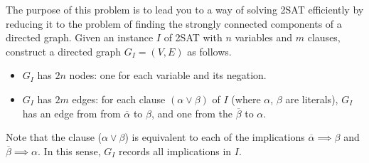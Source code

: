 \documentclass[10.5pt]{article}
\begin{document}
The purpose of this problem is to lead you to a way of solving 2SAT efficiently by reducing it to
the problem of finding the strongly connected components of a directed graph. Given an instance
$I$ of 2SAT with $n$ variables and $m$ clauses, construct a directed graph $G_I = (V, E)$ as follows.
\begin{itemize}
\item $G_I$ has $2n$ nodes: one for each variable and its negation.
\item $G_I$ has $2m$ edges: for each clause $(\alpha \vee \beta)$ of $I$ (where $\alpha$, $\beta$ are literals), $G_I$ has an edge from
from $\overline{\alpha}$ to $\beta$, and one from the $\overline{\beta}$ to $\alpha$.
\end{itemize}
Note that the clause ($\alpha \vee \beta$) is equivalent to each of the implications $\overline{\alpha} \implies \beta$ and $\overline{\beta} \implies \alpha$. In this sense, $G_I$ records all implications in $I$.
\end{document}
